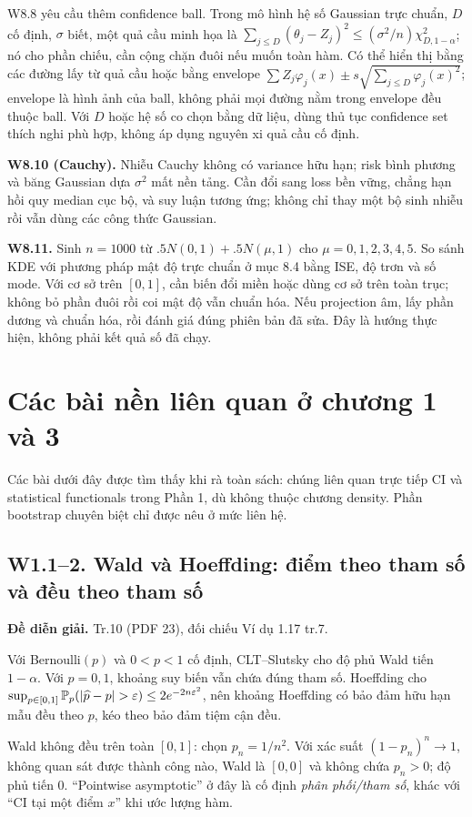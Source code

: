 \documentclass[11pt,a4paper]{article}
\newcommand{\supp}[3]{\subsection{#1. #2}\label{s:#1}\textbf{Đề diễn giải.} #3\par}
\begin{document}
W8.8 yêu cầu thêm confidence ball. Trong mô hình hệ số Gaussian trực chuẩn, $D$ cố định, $\sigma$ biết, một quả cầu minh họa là
$\sum_{j\le D}(\theta_j-Z_j)^2\le(\sigma^2/n)\chi^2_{D,1-\alpha}$; nó cho phần chiếu, cần cộng chặn đuôi nếu muốn toàn hàm. Có thể hiển thị bằng các đường lấy từ quả cầu hoặc bằng envelope $\sum Z_j\varphi_j(x)\pm s\sqrt{\sum_{j\le D}\varphi_j(x)^2}$; envelope là hình ảnh của ball, không phải mọi đường nằm trong envelope đều thuộc ball. Với $D$ hoặc hệ số co chọn bằng dữ liệu, dùng thủ tục confidence set thích nghi phù hợp, không áp dụng nguyên xi quả cầu cố định.

\textbf{W8.10 (Cauchy).} Nhiễu Cauchy không có variance hữu hạn; risk bình phương và băng Gaussian dựa $\sigma^2$ mất nền tảng. Cần đổi sang loss bền vững, chẳng hạn hồi quy median cục bộ, và suy luận tương ứng; không chỉ thay một bộ sinh nhiễu rồi vẫn dùng các công thức Gaussian.

\textbf{W8.11.} Sinh $n=1000$ từ $.5N(0,1)+.5N(\mu,1)$ cho $\mu=0,1,2,3,4,5$. So sánh KDE với phương pháp mật độ trực chuẩn ở mục 8.4 bằng ISE, độ trơn và số mode. Với cơ sở trên $[0,1]$, cần biến đổi miền hoặc dùng cơ sở trên toàn trục; không bỏ phần đuôi rồi coi mật độ vẫn chuẩn hóa. Nếu projection âm, lấy phần dương và chuẩn hóa, rồi đánh giá đúng phiên bản đã sửa. Đây là hướng thực hiện, không phải kết quả số đã chạy.
\section{Các bài nền liên quan ở chương 1 và 3}
Các bài dưới đây được tìm thấy khi rà toàn sách: chúng liên quan trực tiếp CI và statistical functionals trong Phần 1, dù không thuộc chương density. Phần bootstrap chuyên biệt chỉ được nêu ở mức liên hệ.

\supp{W1.1--2}{Wald và Hoeffding: điểm theo tham số và đều theo tham số}{Tr.10 (PDF 23), đối chiếu Ví dụ 1.17 tr.7.}
Với Bernoulli$(p)$ và $0<p<1$ cố định, CLT--Slutsky cho độ phủ Wald tiến $1-\alpha$. Với $p=0,1$, khoảng suy biến vẫn chứa đúng tham số. Hoeffding cho
$\sup_{p\in[0,1]}\Pp_p(|\widehat p-p|>\varepsilon)\le2e^{-2n\varepsilon^2}$,
nên khoảng Hoeffding có bảo đảm hữu hạn mẫu đều theo $p$, kéo theo bảo đảm tiệm cận đều.

Wald không đều trên toàn $[0,1]$: chọn $p_n=1/n^2$. Với xác suất $(1-p_n)^n\to1$, không quan sát được thành công nào, Wald là $[0,0]$ và không chứa $p_n>0$; độ phủ tiến 0. ``Pointwise asymptotic'' ở đây là cố định \emph{phân phối/tham số}, khác với ``CI tại một điểm $x$'' khi ước lượng hàm.
\end{document}
